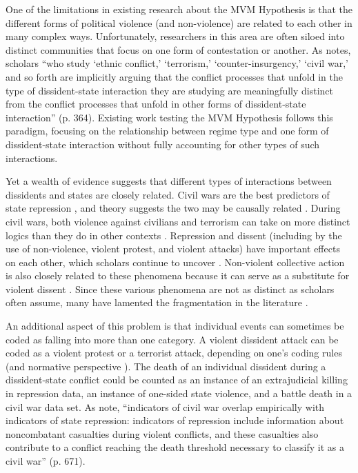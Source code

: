 \documentclass[titlepage, onecolumn,12pt]{article}
\begin{document}
One of the limitations in existing research about the MVM Hypothesis is that the different forms of political violence (and non-violence) are related to each other in many complex ways. Unfortunately, researchers in this area are often siloed into distinct communities that focus on one form of contestation or another. As \citet{moore2015tilting} notes, scholars ``who study `ethnic conflict,' `terrorism,' `counter-insurgency,' `civil war,' and so forth are implicitly arguing that the conflict processes that unfold in the type of dissident-state interaction they are studying are meaningfully distinct from the conflict processes that unfold in other forms of dissident-state interaction'' (p. 364). Existing work testing the MVM Hypothesis follows this paradigm, focusing on the relationship between regime type and one form of dissident-state interaction without fully accounting for other types of such interactions.

Yet a wealth of evidence suggests that different types of interactions between dissidents and states are closely related. Civil wars are the best predictors of state repression \citep{HillJones}, and theory suggests the two may be causally related \citep{besley2011logic}. During civil wars, both violence against civilians and terrorism can take on more distinct logics than they do in other contexts \citep{kalyvas2006logic,findley2012terrorism,fortna2015terrorists}. Repression and dissent (including by the use of non-violence, violent protest, and violent attacks) have important effects on each other, which scholars continue to uncover \citep{rasler1996concessions,carey2006dynamic,walsh2010respecting,ritter2013policy}. Non-violent collective action is also closely related to these phenomena because it can serve as a substitute for violent dissent \citep{lichbach1987deterrence,Moore1998,chenoweth2011civil}. Since these various phenomena are not as distinct as scholars often assume, many have lamented the fragmentation in the literature \citep{lichbach1992nobody,Davenport2012}.

An additional aspect of this problem is that individual events can sometimes be coded as falling into more than one category.  A violent dissident attack can be coded as a violent protest or a terrorist attack, depending on one's coding rules (and normative perspective \citep{moore2015tilting}). The death of an individual dissident during a dissident-state conflict could be counted as an instance of an extrajudicial killing in repression data, an instance of one-sided state violence, and a battle death in a civil war data set. As \citet{HillJones} note, ``indicators of civil war overlap empirically with indicators of state repression: indicators of repression include information about noncombatant casualties during violent conflicts, and these casualties also contribute to a conflict reaching the death threshold necessary to classify it as a civil war'' (p. 671).
\end{document}
